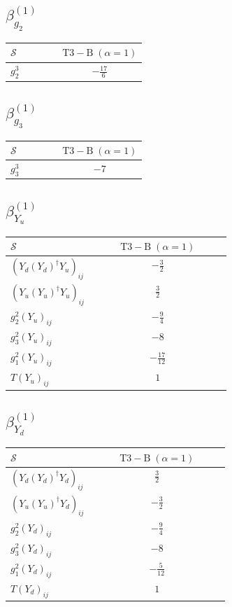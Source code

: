 \documentclass[9pt]{article}
\begin{document}
\subsection*{$ \beta_{g_2}^{(1)} $}
\begin{longtable}{@{}p{0.38\linewidth}c@{}}
\toprule
$\mathcal{S}$ & $ \mathrm{T3-B}\;(\alpha=1) $ \\
\midrule
$ g_2^3 $ & $ - \frac{17}{6} $ \\
\bottomrule
\end{longtable}
\subsection*{$ \beta_{g_3}^{(1)} $}
\begin{longtable}{@{}p{0.38\linewidth}c@{}}
\toprule
$\mathcal{S}$ & $ \mathrm{T3-B}\;(\alpha=1) $ \\
\midrule
$ g_3^3 $ & $ -7 $ \\
\bottomrule
\end{longtable}
\subsection*{$ \beta_{Y_u}^{(1)} $}
\begin{longtable}{@{}p{0.38\linewidth}c@{}}
\toprule
$\mathcal{S}$ & $ \mathrm{T3-B}\;(\alpha=1) $ \\
\midrule
$ (Y_d (Y_d)^{\dagger} Y_u)_{ij} $ & $ - \frac{3}{2} $ \\
$ (Y_u (Y_u)^{\dagger} Y_u)_{ij} $ & $ \frac{3}{2} $ \\
$ g_2^2 (Y_u)_{ij} $ & $ - \frac{9}{4} $ \\
$ g_3^2 (Y_u)_{ij} $ & $ -8 $ \\
$ g_1^2 (Y_u)_{ij} $ & $ - \frac{17}{12} $ \\
$ T (Y_u)_{ij} $ & $ 1 $ \\
\bottomrule
\end{longtable}
\subsection*{$ \beta_{Y_d}^{(1)} $}
\begin{longtable}{@{}p{0.38\linewidth}c@{}}
\toprule
$\mathcal{S}$ & $ \mathrm{T3-B}\;(\alpha=1) $ \\
\midrule
$ (Y_d (Y_d)^{\dagger} Y_d)_{ij} $ & $ \frac{3}{2} $ \\
$ (Y_u (Y_u)^{\dagger} Y_d)_{ij} $ & $ - \frac{3}{2} $ \\
$ g_2^2 (Y_d)_{ij} $ & $ - \frac{9}{4} $ \\
$ g_3^2 (Y_d)_{ij} $ & $ -8 $ \\
$ g_1^2 (Y_d)_{ij} $ & $ - \frac{5}{12} $ \\
$ T (Y_d)_{ij} $ & $ 1 $ \\
\bottomrule
\end{longtable}
\end{document}
